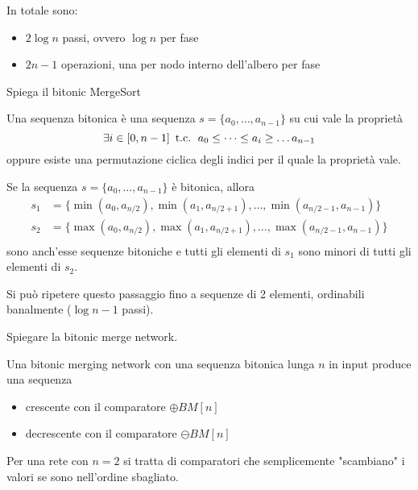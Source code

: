 \begin{questions}
\begin{solution}
        In totale sono: 
        \begin{itemize}
            \item $2 \log n$ passi, ovvero $\log n$ per fase
            
            \item $2n - 1$ operazioni, una per nodo interno dell'albero per fase
        \end{itemize}
    \end{solution}
    
    \question Spiega il bitonic MergeSort
    
    \begin{solution}
        Una sequenza bitonica è una sequenza $s = \{a_0, \dots, a_{n-1}\}$ su cui vale la proprietà
        $$ \exists i \in [0, n-1] \, \text{ t.c. } \, a_0 \leq \dots \leq a_i \geq \dots a_{n-1} $$
        oppure esiste una permutazione ciclica degli indici per il quale la proprietà vale.
        
        Se la sequenza $s = \{a_0, \dots, a_{n-1}\}$ è bitonica, allora
        \begin{align*}
            s_1 & = \{\min(a_0, a_{n/2}), \min(a_1, a_{n/2 + 1}), \dots, \min (a_{n/2 - 1}, a_{n-1})\} \\
            s_2 & = \{\max(a_0, a_{n/2}), \max(a_1, a_{n/2 + 1}), \dots, \max (a_{n/2 - 1}, a_{n-1})\} \\
        \end{align*}
        sono anch'esse sequenze bitoniche e tutti gli elementi di $s_1$ sono minori di tutti gli elementi di $s_2$.
        
        Si può ripetere questo passaggio fino a sequenze di 2 elementi, ordinabili banalmente ($\log n - 1$ passi).
    \end{solution}
    
    \question Spiegare la bitonic merge network.
    
    \begin{solution}
        Una bitonic merging network con una sequenza bitonica lunga $n$ in input produce una sequenza 
        \begin{itemize}
            \item crescente con il comparatore $\oplus BM[n]$
            \item decrescente con il comparatore $\ominus BM[n]$
        \end{itemize}
        
        Per una rete con $n=2$ si tratta di comparatori che semplicemente "scambiano" i valori se sono nell'ordine sbagliato. 
        

\end{solution}
\end{questions}
